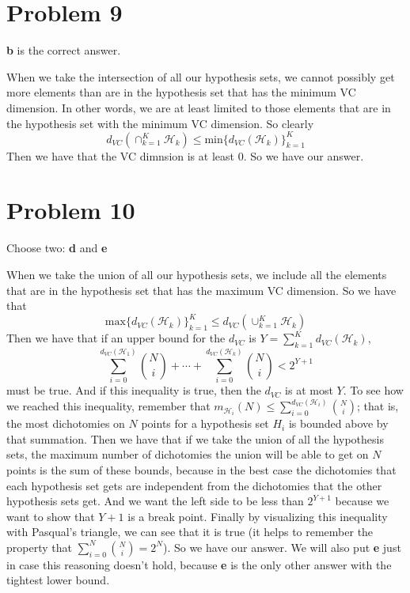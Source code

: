 \documentclass{article}
\begin{document}
\section*{Problem 9}
\textbf{b} is the correct answer.

\noindent When we take the intersection of all our hypothesis sets, we cannot
possibly get more elements than are in the hypothesis set that has the minimum
VC dimension. In other words, we are at least limited to those elements that
are in the hypothesis set with the minimum VC dimension. So clearly
\[ d_{VC}(\cap_{k=1}^{K}\mathcal{H}_k) \leq \text{min}\{d_{VC}(\mathcal{H}_k)\}
    _{k=1}^{K} \]
Then we have that the VC dimnsion is at least $0$. So we have our answer.

\section*{Problem 10}
Choose two: \textbf{d} and \textbf{e}

\noindent When we take the union of all our hypothesis sets, we include
all the elements that are in the hypothesis set that has the maximum VC
dimension. So we have that
\[ \text{max}\{d_{VC}(\mathcal{H}_k)\}_{k=1}^K \leq d_{VC}(\cup_{k=1}^K
    \mathcal{H}_k) \]
Then we have that if an upper bound for the $d_{VC}$ is
$Y = \sum_{k=1}^K d_{VC}(\mathcal{H}_k)$,
\[ \sum_{i=0}^{d_{VC}(\mathcal{H}_1)} \binom{N}{i} + \cdots +
    \sum_{i=0}^{d_{VC}(\mathcal{H}_k)} \binom{N}{i} < 2^{Y+1} \]
must be true. And if this inequality is true, then the $d_{VC}$ is at most
$Y$. To see how we reached this inequality, remember that $m_{\mathcal{H}_i}(N) \leq
\sum_{i=0}^{d_{VC}(\mathcal{H}_i)} \binom{N}{i}$; that is, the most dichotomies
on $N$ points for a hypothesis set $H_i$ is bounded above by that summation.
Then we have that if we take the union of all the hypothesis sets, the maximum
number of dichotomies the union
will be able to get on $N$ points is the sum of these bounds, because in the
best case the dichotomies that each hypothesis set gets are independent from
the dichotomies that the other hypothesis sets get. And we want the left side
to be less than $2^{Y+1}$ because we want to show that $Y+1$ is a break point.
Finally by visualizing this inequality with Pasqual's triangle, we can see
that it is true (it helps to remember the property that
$\sum_{i=0}^{N} \binom{N}{i} = 2^N$). So we have our answer. We will also
put \textbf{e} just in case this reasoning doesn't hold, because \textbf{e}
is the only other answer with the tightest lower bound.
\end{document}
